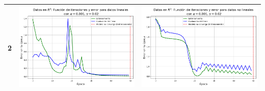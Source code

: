 \documentclass{article}
\begin{document}
\begin{table}[h!]
\begin{tabular}{|c|M{68mm}|M{68mm}|}
        2 & \includegraphics[width=\linewidth]{imgs/R2/Lineal_2.png} & \includegraphics[width=\linewidth]{imgs/R2/Nonlineal_2.png} \\
        \hline

\end{tabular}
\end{table}
\end{document}

